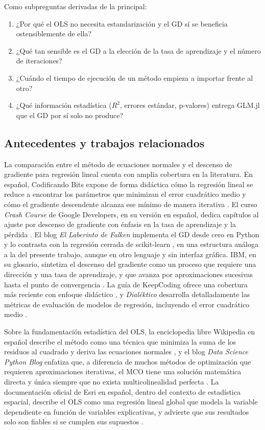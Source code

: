 \documentclass[11pt,a4paper]{article}
\begin{document}
Como subpreguntas derivadas de la principal:
\begin{enumerate}
    \item ¿Por qué el OLS no necesita estandarización y el GD sí se beneficia ostensiblemente de ella?
    \item ¿Qué tan sensible es el GD a la elección de la tasa de aprendizaje y el número de iteraciones?
    \item ¿Cuándo el tiempo de ejecución de un método empieza a importar frente al otro?
    \item ¿Qué información estadística ($R^2$, errores estándar, p-valores) entrega GLM.jl que el GD por sí solo no produce?
\end{enumerate}

\subsection{Antecedentes y trabajos relacionados}

La comparación entre el método de ecuaciones normales y el descenso de gradiente para regresión lineal cuenta con amplia cobertura en la literatura. En español, Codificando Bits expone de forma didáctica cómo la regresión lineal se reduce a encontrar los parámetros que minimizan el error cuadrático medio y cómo el gradiente descendente alcanza ese mínimo de manera iterativa \cite{codificando_lineal}. El curso \textit{Crash Course} de Google Developers, en su versión en español, dedica capítulos al ajuste por descenso de gradiente con énfasis en la tasa de aprendizaje y la pérdida \cite{google_gd}. El blog \textit{El Laberinto de Falken} implementa el GD desde cero en Python y lo contrasta con la regresión cerrada de scikit-learn \cite{falken}, en una estructura análoga a la del presente trabajo, aunque en otro lenguaje y sin interfaz gráfica. IBM, en su glosario, sintetiza el descenso del gradiente como un proceso que requiere una dirección y una tasa de aprendizaje, y que avanza por aproximaciones sucesivas hasta el punto de convergencia \cite{ibm_gd}. La guía de KeepCoding ofrece una cobertura más reciente con enfoque didáctico \cite{keepcoding_gd}, y \textit{Dialéktico} desarrolla detalladamente las métricas de evaluación de modelos de regresión, incluyendo el error cuadrático medio \cite{dialektico_metricas}.

Sobre la fundamentación estadística del OLS, la enciclopedia libre Wikipedia en español describe el método como una técnica que minimiza la suma de los residuos al cuadrado y deriva las ecuaciones normales \cite{wiki_mco}, y el blog \textit{Data Science Python Blog} enfatiza que, a diferencia de muchos métodos de optimización que requieren aproximaciones iterativas, el MCO tiene una solución matemática directa y única siempre que no exista multicolinealidad perfecta \cite{cds_mco}. La documentación oficial de Esri en español, dentro del contexto de estadística espacial, describe el OLS como una regresión lineal global que modela la variable dependiente en función de variables explicativas, y advierte que sus resultados solo son fiables si se cumplen sus supuestos \cite{esri_ols}.
\end{document}
